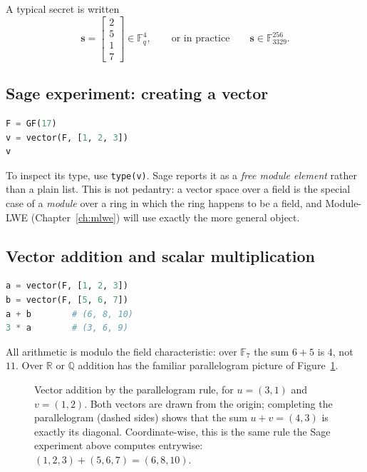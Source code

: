 A typical secret is written
\[
\mathbf{s} = \begin{bmatrix}2\\5\\1\\7\end{bmatrix} \in \mathbb{F}_{q}^{4},
\qquad\text{or in practice}\qquad
\mathbf{s} \in \mathbb{F}_{3329}^{256}.
\]

\subsection{Sage experiment: creating a vector}

\begin{lstlisting}[language=Python]
F = GF(17)
v = vector(F, [1, 2, 3])
v
\end{lstlisting}

To inspect its type, use \texttt{type(v)}. Sage reports it as a \emph{free module element} rather than a plain list. This is not pedantry: a vector space over a field is the special case of a \emph{module} over a ring in which the ring happens to be a field, and Module-LWE (Chapter~\ref{ch:mlwe}) will use exactly the more general object.

\subsection{Vector addition and scalar multiplication}

\begin{lstlisting}[language=Python]
a = vector(F, [1, 2, 3])
b = vector(F, [5, 6, 7])
a + b        # (6, 8, 10)
3 * a        # (3, 6, 9)
\end{lstlisting}

All arithmetic is modulo the field characteristic: over $\mathbb{F}_7$ the sum $6+5$ is $4$, not $11$. Over $\mathbb{R}$ or $\mathbb{Q}$ addition has the familiar parallelogram picture of Figure~\ref{fig:vector-addition}.

\begin{figure}[H]
\centering
{}
\caption{Vector addition by the parallelogram rule, for $u=(3,1)$ and $v=(1,2)$. Both vectors are drawn from the origin; completing the parallelogram (dashed sides) shows that the sum $u+v=(4,3)$ is exactly its diagonal. Coordinate-wise, this is the same rule the Sage experiment above computes entrywise: $(1,2,3)+(5,6,7)=(6,8,10)$.}
\label{fig:vector-addition}
\end{figure}

